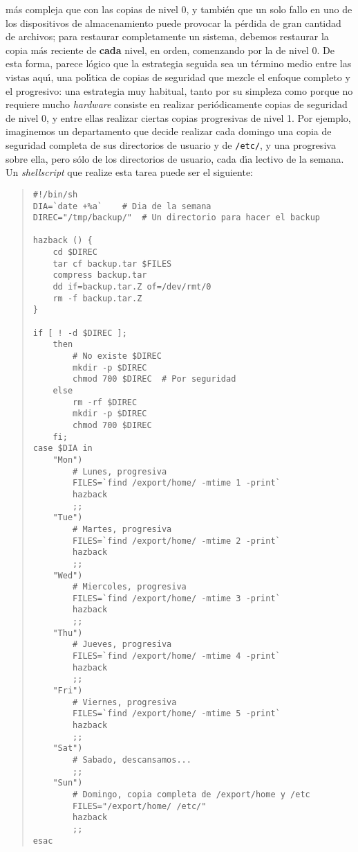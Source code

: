 m\'as compleja que con las copias de nivel 0, y tambi\'en que un solo fallo en 
uno de los dispositivos de almacenamiento puede provocar la p\'erdida de gran 
cantidad de archivos; para restaurar completamente un sistema, debemos restaurar
la copia m\'as reciente de {\bf cada} nivel, en orden, comenzando por la de
nivel 0. De esta forma, parece l\'ogico que la estrategia seguida 
sea un t\'ermino medio entre las vistas aqu\'{\i}, una pol\'{\i}tica de copias 
de seguridad que mezcle el enfoque completo y el progresivo: una estrategia
muy habitual, tanto por su simpleza como porque no requiere mucho {\it 
hardware} consiste en realizar peri\'odicamente copias de seguridad de nivel
0, y entre ellas realizar ciertas copias progresivas de nivel 1. Por ejemplo,
imaginemos un departamento que decide realizar cada domingo una copia de 
seguridad completa de sus directorios de usuario y de {\tt /etc/}, y una 
progresiva sobre ella, pero s\'olo de los directorios de usuario, cada d\'{\i}a 
lectivo de la semana. Un {\it shellscript} que realize esta tarea puede ser el 
siguiente:
\tt
\begin{quote}
\begin{verbatim}
#!/bin/sh
DIA=`date +%a`    # Dia de la semana
DIREC="/tmp/backup/"  # Un directorio para hacer el backup

hazback () {
    cd $DIREC
    tar cf backup.tar $FILES
    compress backup.tar
    dd if=backup.tar.Z of=/dev/rmt/0
    rm -f backup.tar.Z
}

if [ ! -d $DIREC ]; 
    then
        # No existe $DIREC
        mkdir -p $DIREC
        chmod 700 $DIREC  # Por seguridad
    else 
        rm -rf $DIREC
        mkdir -p $DIREC
        chmod 700 $DIREC
    fi;
case $DIA in
    "Mon") 
        # Lunes, progresiva
        FILES=`find /export/home/ -mtime 1 -print`
        hazback
        ;;	
    "Tue") 
        # Martes, progresiva
        FILES=`find /export/home/ -mtime 2 -print`
        hazback
        ;;	
    "Wed") 
        # Miercoles, progresiva
        FILES=`find /export/home/ -mtime 3 -print`
        hazback
        ;;	
    "Thu") 
        # Jueves, progresiva
        FILES=`find /export/home/ -mtime 4 -print`
        hazback
        ;;	
    "Fri") 
        # Viernes, progresiva
        FILES=`find /export/home/ -mtime 5 -print`
        hazback
        ;;	
    "Sat")
        # Sabado, descansamos...
        ;;
    "Sun")
        # Domingo, copia completa de /export/home y /etc
        FILES="/export/home/ /etc/"
        hazback
        ;;
esac
\end{verbatim}
\end{quote}
